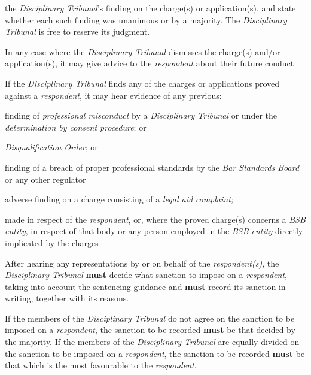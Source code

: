 the \emph{Disciplinary Tribunal}'s finding on the charge(s) or
application(s), and state whether each such finding was unanimous or by
a majority. The \emph{Disciplinary Tribunal} is free to reserve its
judgment.\\
\par
In any case where the \emph{Disciplinary Tribunal} dismisses the
charge(s) and/or application(s), it may give advice to
the \emph{respondent} about their future conduct\\
\par
{}
If the \emph{Disciplinary Tribunal} finds any of the charges or
applications proved against a \emph{respondent}, it may hear evidence of
any previous:\\\nl \item finding of \emph{professional misconduct} by a \emph{Disciplinary
Tribunal} or under the \emph{determination by consent procedure}; or\item \emph{Disqualification Order}; or\item finding of a breach of proper professional standards by the \emph{Bar
Standards Board} or any other regulator\item adverse finding on a charge consisting of a \emph{legal
aid} \emph{complaint;}\par
made in respect of the \emph{respondent}, or, where the proved charge(s)
concerns a \emph{BSB entity}, in respect of that body or any person
employed in the \emph{BSB entity} directly implicated by the charges\ln
{}\par
After hearing any representations by or on behalf of
the \emph{respondent(s)}, the \emph{Disciplinary Tribunal}  \textcolor{myred}{\textbf{must}} decide
what sanction to impose on a \emph{respondent}, taking into account the
sentencing guidance and  \textcolor{myred}{\textbf{must}} record its sanction in writing, together
with its reasons.\\
\par
If the members of the \emph{Disciplinary Tribunal} do not agree on the
sanction to be imposed on a \emph{respondent}, the sanction to be
recorded  \textcolor{myred}{\textbf{must}} be that decided by the majority. If the members of
the \emph{Disciplinary Tribunal} are equally divided on the sanction to
be imposed on a \emph{respondent}, the sanction to be recorded  \textcolor{myred}{\textbf{must}} be
that which is the most favourable to the \emph{respondent}.\\
